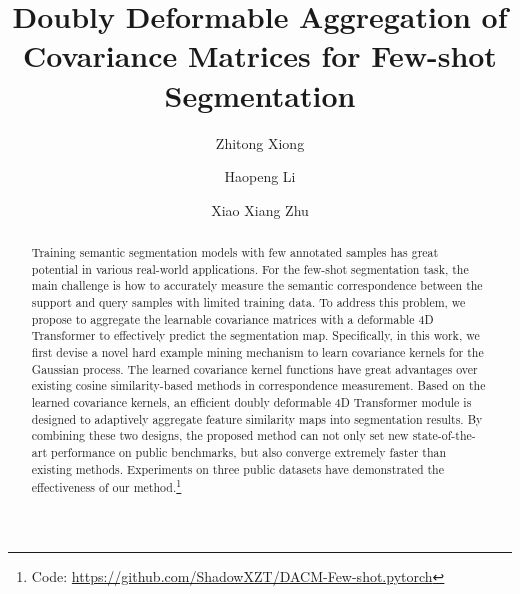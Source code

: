 \documentclass[runningheads]{llncs}
\begin{document}
\pagestyle{headings}
\mainmatter
\def\ECCVSubNumber{3080}  


\title{Doubly Deformable Aggregation of Covariance Matrices for Few-shot Segmentation} 



\author{Zhitong Xiong   \and
Haopeng Li   \and
Xiao Xiang Zhu  }
\maketitle

\begin{abstract}
Training semantic segmentation models with few annotated samples has great potential in various real-world applications. For the few-shot segmentation task, the main challenge is how to accurately measure the semantic correspondence between the support and query samples with limited training data. To address this problem, we propose to aggregate the learnable covariance matrices with a deformable 4D Transformer to effectively predict the segmentation map. Specifically, in this work, we first devise a novel hard example mining mechanism to learn covariance kernels for the Gaussian process. The learned covariance kernel functions have great advantages over existing cosine similarity-based methods in correspondence measurement. Based on the learned covariance kernels, an efficient doubly deformable 4D Transformer module is designed to adaptively aggregate feature similarity maps into segmentation results. By combining these two designs, the proposed method can not only set new state-of-the-art performance on public benchmarks, but also converge extremely faster than existing methods. Experiments on three public datasets have demonstrated the effectiveness of our method.\footnote{Code: \url{https://github.com/ShadowXZT/DACM-Few-shot.pytorch}}

\end{abstract}
\end{document}
